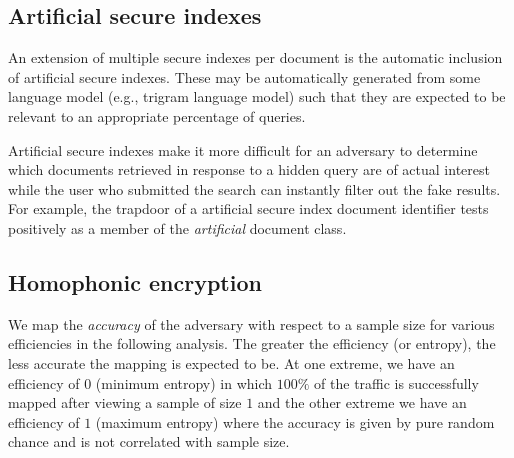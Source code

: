 \documentclass[final,11pt]{article}
\numberwithin{equation}{section}
\theoremstyle{plain}
\theoremstyle{remark}
\begin{document}
\subsection{Artificial secure indexes}
An extension of multiple secure indexes per document is the automatic inclusion of artificial secure indexes. These may be automatically generated from some language model (e.g., trigram language model) such that they are expected to be relevant to an appropriate percentage of queries.

Artificial secure indexes make it more difficult for an adversary to determine which documents retrieved in response to a hidden query are of actual interest while the user who submitted the search can instantly filter out the fake results. For example, the trapdoor of a artificial secure index document identifier tests positively as a member of the \emph{artificial} document class.



\subsection{Homophonic encryption}
We map the \emph{accuracy} of the adversary with respect to a sample size for various efficiencies in the following analysis. The greater the efficiency (or entropy), the less accurate the mapping is expected to be. At one extreme, we have an efficiency of $0$ (minimum entropy) in which $100\%$ of the traffic is successfully mapped after viewing a sample of size $1$ and the other extreme we have an efficiency of $1$ (maximum entropy) where the accuracy is given by pure random chance and is not correlated with sample size.

 \datazero     %
 \dataa %
 \datab %
 \datac        %
 \datad        %
 \datae       %
 \dataf      %
 \datag   %
 \datah   %
 \datai   %
 \dataj  %
 \datak  %
 \datak %
 \datal           %
\end{document}
